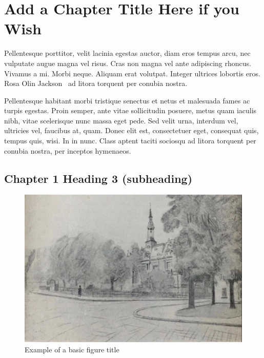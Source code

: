 \chapter{Add a Chapter Title Here if you Wish}



Pellentesque porttitor, velit lacinia egestas auctor, diam eros tempus arcu, nec vulputate augue magna vel risus. Cras non magna vel ante adipiscing rhoncus. Vivamus a mi. Morbi neque. Aliquam erat volutpat. Integer ultrices lobortis eros. Rosa Olin Jackson~\cite{waveshaping} ad litora torquent per conubia nostra.\par

Pellentesque habitant morbi tristique senectus et netus et malesuada fames ac turpis egestas. Proin semper, ante vitae sollicitudin posuere, metus quam iaculis nibh, vitae scelerisque nunc massa eget pede. Sed velit urna, interdum vel, ultricies vel, faucibus at, quam. Donec elit est, consectetuer eget, consequat quis, tempus quis, wisi. In in nunc. Class aptent taciti sociosqu ad litora torquent per conubia nostra, per inceptos hymenaeos.\par




\section{Chapter 1 Heading 3 (subheading)}

\begin{figure}
\includegraphics[width=1\textwidth]{figures/Picture1}

\label{fig:img1}
\caption{Example of a basic figure title}
\end{figure}

